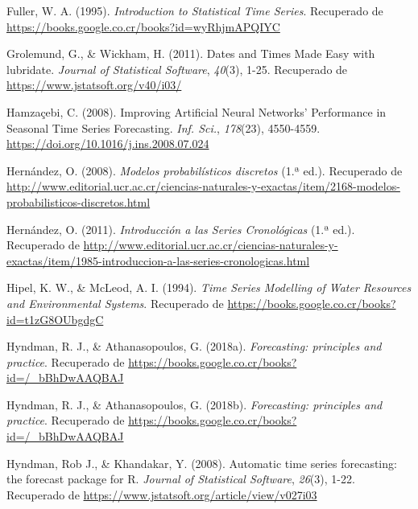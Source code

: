 \documentclass[
]{article}
\newlength{\cslhangindent}
\newlength{\cslentryspacingunit} %
\newenvironment{CSLReferences}[2] %
 {%
  \setlength{\parindent}{0pt}
  \ifodd #1
  \let\oldpar\par
  \def\par{\hangindent=\cslhangindent\oldpar}
  \fi
  \setlength{\parskip}{#2\cslentryspacingunit}
 }%
 {}
\begin{document}
\begin{CSLReferences}{1}{0}
\leavevmode{}%
Fuller, W. A. (1995). \emph{Introduction to Statistical Time Series}.
Recuperado de \url{https://books.google.co.cr/books?id=wyRhjmAPQIYC}

\leavevmode{}%
Grolemund, G., \& Wickham, H. (2011). Dates and Times Made Easy with
{lubridate}. \emph{Journal of Statistical Software}, \emph{40}(3), 1-25.
Recuperado de \url{https://www.jstatsoft.org/v40/i03/}

\leavevmode{}%
Hamzaçebi, C. (2008). Improving Artificial Neural Networks' Performance
in Seasonal Time Series Forecasting. \emph{Inf. Sci.}, \emph{178}(23),
4550-4559. \url{https://doi.org/10.1016/j.ins.2008.07.024}

\leavevmode{}%
Hernández, O. (2008). \emph{Modelos probabilísticos discretos} (1.ª
ed.). Recuperado de
\url{http://www.editorial.ucr.ac.cr/ciencias-naturales-y-exactas/item/2168-modelos-probabilisticos-discretos.html}

\leavevmode{}%
Hernández, O. (2011). \emph{Introducción a las Series Cronológicas} (1.ª
ed.). Recuperado de
\url{http://www.editorial.ucr.ac.cr/ciencias-naturales-y-exactas/item/1985-introduccion-a-las-series-cronologicas.html}

\leavevmode{}%
Hipel, K. W., \& McLeod, A. I. (1994). \emph{Time Series Modelling of
Water Resources and Environmental Systems}. Recuperado de
\url{https://books.google.co.cr/books?id=t1zG8OUbgdgC}

\leavevmode{}%
Hyndman, R. J., \& Athanasopoulos, G. (2018a). \emph{Forecasting:
principles and practice}. Recuperado de
\url{https://books.google.co.cr/books?id=/_bBhDwAAQBAJ}

\leavevmode{}%
Hyndman, R. J., \& Athanasopoulos, G. (2018b). \emph{Forecasting:
principles and practice}. Recuperado de
\url{https://books.google.co.cr/books?id=/_bBhDwAAQBAJ}

\leavevmode{}%
Hyndman, Rob J., \& Khandakar, Y. (2008). Automatic time series
forecasting: the forecast package for {R}. \emph{Journal of Statistical
Software}, \emph{26}(3), 1-22. Recuperado de
\url{https://www.jstatsoft.org/article/view/v027i03}


\end{CSLReferences}
\end{document}

